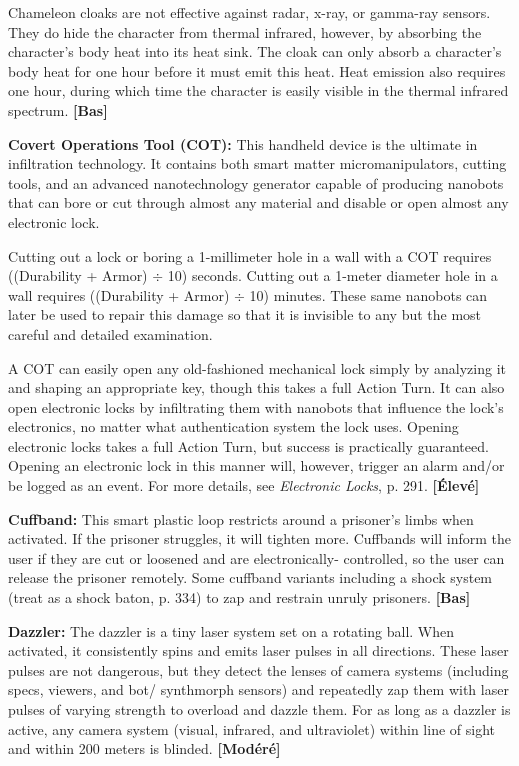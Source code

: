 {{Chameleon cloaks are not effective against radar, x-ray, or gamma-ray sensors. They do hide the character from thermal infrared, however, by absorbing the character’s body heat into its heat sink. The cloak can only absorb a character’s body heat for one hour before it must emit this heat. Heat emission also requires one hour, during which time the character is easily visible in the thermal infrared spectrum. \textbf{[Bas]} 

\textbf{Covert Operations Tool (COT):} This handheld device is the ultimate in infiltration technology. It contains both smart matter micromanipulators, cutting tools, and an advanced nanotechnology generator capable of producing nanobots that can bore or cut through almost any material and disable or open almost any electronic lock. 

Cutting out a lock or boring a 1-millimeter hole in a wall with a COT requires ((Durability + Armor) $\div$ 10) seconds. Cutting out a 1-meter diameter hole in a wall requires ((Durability + Armor) $\div$ 10) minutes. These same nanobots can later be used to repair this damage so that it is invisible to any but the most careful and detailed examination. 

A COT can easily open any old-fashioned mechanical lock simply by analyzing it and shaping an appropriate key, though this takes a full Action Turn. It can also open electronic locks by infiltrating them with nanobots that influence the lock’s electronics, no matter what authentication system the lock uses. Opening electronic locks takes a full Action Turn, but success is practically guaranteed. Opening an electronic lock in this manner will, however, trigger an alarm and/or be logged as an event. For more details, see \emph{Electronic Locks}, p. 291. \textbf{[Élevé]} 

\textbf{Cuffband:} This smart plastic loop restricts around a prisoner’s limbs when activated. If the prisoner struggles, it will tighten more. Cuffbands will inform the user if they are cut or loosened and are electronically- controlled, so the user can release the prisoner remotely. Some cuffband variants including a shock system (treat as a shock baton, p. 334) to zap and restrain unruly prisoners. \textbf{[Bas]} 

\textbf{Dazzler:} The dazzler is a tiny laser system set on a rotating ball. When activated, it consistently spins and emits laser pulses in all directions. These laser pulses are not dangerous, but they detect the lenses of camera systems (including specs, viewers, and bot/ synthmorph sensors) and repeatedly zap them with laser pulses of varying strength to overload and dazzle them. For as long as a dazzler is active, any camera system (visual, infrared, and ultraviolet) within line of sight and within 200 meters is blinded. \textbf{[Modéré]} 

}}
